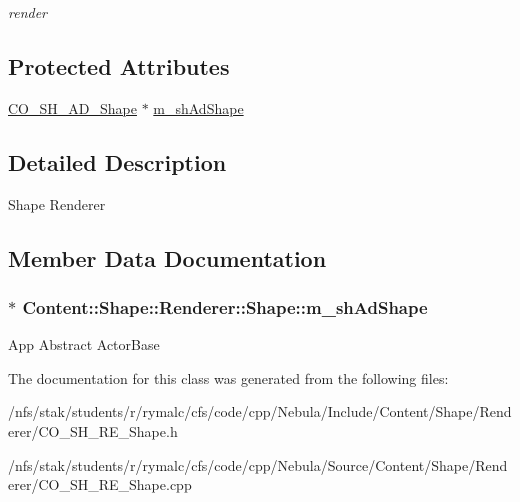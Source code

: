 \begin{DoxyCompactItemize}
\begin{DoxyCompactList}\small\item\em render \item\end{DoxyCompactList}\end{DoxyCompactItemize}
\subsection*{Protected Attributes}
\begin{DoxyCompactItemize}
\item 
\hyperlink{classContent_1_1Shape_1_1Admin_1_1Shape}{CO\_\-SH\_\-AD\_\-Shape} $\ast$ \hyperlink{classContent_1_1Shape_1_1Renderer_1_1Shape_a1d040dfed7129c8c7db171a945660744}{m\_\-shAdShape}
\end{DoxyCompactItemize}


\subsection{Detailed Description}
Shape Renderer 

\subsection{Member Data Documentation}
\hypertarget{classContent_1_1Shape_1_1Renderer_1_1Shape_a1d040dfed7129c8c7db171a945660744}{
\subsubsection[{m\_\-shAdShape}]{$\ast$ {\bf Content::Shape::Renderer::Shape::m\_\-shAdShape}}}
\label{classContent_1_1Shape_1_1Renderer_1_1Shape_a1d040dfed7129c8c7db171a945660744}
App Abstract ActorBase 

The documentation for this class was generated from the following files:\begin{DoxyCompactItemize}
\item 
/nfs/stak/students/r/rymalc/cfs/code/cpp/Nebula/Include/Content/Shape/Renderer/CO\_\-SH\_\-RE\_\-Shape.h\item 
/nfs/stak/students/r/rymalc/cfs/code/cpp/Nebula/Source/Content/Shape/Renderer/CO\_\-SH\_\-RE\_\-Shape.cpp\end{DoxyCompactItemize}
